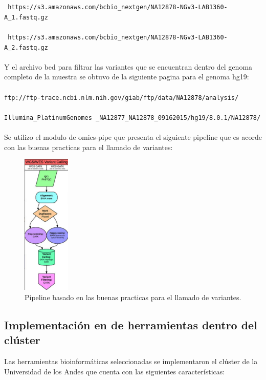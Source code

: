{\texttt{ https://s3.amazonaws.com/bcbio\_nextgen/NA12878-NGv3-LAB1360-A\_1.fastq.gz}\\
\\
{\texttt{ https://s3.amazonaws.com/bcbio\_nextgen/NA12878-NGv3-LAB1360-A\_2.fastq.gz}}\\
\\
Y el archivo bed para filtrar las variantes que se encuentran dentro del genoma completo de la muestra se obtuvo de la siguiente pagina para el genoma hg19: \\
\\
\texttt{ftp://ftp-trace.ncbi.nlm.nih.gov/giab/ftp/data/NA12878/analysis/}\\
\\
\texttt{Illumina\_PlatinumGenomes \_NA12877\_NA12878\_09162015/hg19/8.0.1/NA12878/} \\
\\	
Se utilizo el modulo de omics-pipe que presenta el siguiente pipeline que es acorde con las buenas practicas para el llamado de variantes: \\
	
\begin{figure}[H] 
	\centering
	\includegraphics[width=0.2\textwidth]{Kap2/pipe}
	\caption{Pipeline basado en las buenas practicas para el llamado de variantes.} \label{fig:pipeline}
\end{figure}
	
	\subsection{Implementación en de herramientas dentro del clúster}
	
	Las herramientas bioinformáticas seleccionadas se implementaron el  clúster de la Universidad de los Andes que cuenta con las siguientes características:
	
}
